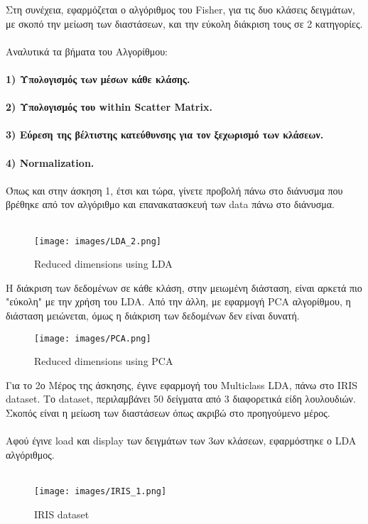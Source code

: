\documentclass[12pt]{article}
\begin{document}
Στη συνέχεια, εφαρμόζεται ο αλγόριθμος του Fisher, για τις δυο κλάσεις δειγμάτων, με σκοπό την μείωση των διαστάσεων, και την εύκολη διάκριση τους σε 2 κατηγορίες. \\\\
Αναλυτικά τα βήματα του Αλγορίθμου:\\\\

{\bfseries 1) Υπολογισμός των μέσων κάθε κλάσης.\\\\
2) Υπολογισμός του within Scatter Matrix.\\\\
3) Εύρεση της βέλτιστης κατεύθυνσης για τον ξεχωρισμό των κλάσεων.\\\\
4) Normalization.\\}\\

Όπως και στην άσκηση 1, έτσι και τώρα, γίνετε προβολή πάνω στο διάνυσμα που βρέθηκε από τον αλγόριθμο και επανακατασκευή των data πάνω στο διάνυσμα.\\ \\
\begin{figure}[!h]
    \centering
    \texttt{[image: images/LDA\_2.png]}
    \caption{Reduced dimensions using LDA}
    \label{fig:my_label}
\end{figure}

 Η διάκριση των δεδομένων σε κάθε κλάση, στην μειωμένη διάσταση, είναι αρκετά πιο "εύκολη" με την χρήση του LDA. Από την άλλη, με εφαρμογή PCA αλγορίθμου, η διάσταση μειώνεται, όμως η διάκριση των δεδομένων δεν είναι δυνατή. \\
 \begin{figure}[!h]
     \centering
     \texttt{[image: images/PCA.png]}
     \caption{Reduced dimensions using PCA}
     \label{fig:my_label}
 \end{figure}
 
 Για το 2ο Μέρος της άσκησης, έγινε εφαρμογή του Multiclass LDA, πάνω στο IRIS dataset. Το dataset, περιλαμβάνει 50 δείγματα από 3 διαφορετικά είδη λουλουδιών. Σκοπός είναι η μείωση των διαστάσεων όπως ακριβώ στο προηγούμενο μέρος.\\\\
 Αφού έγινε load και display των δειγμάτων των 3ων κλάσεων, εφαρμόστηκε ο LDA αλγόριθμος.\\\\
 \begin{figure}[!h]
     \centering
     \texttt{[image: images/IRIS\_1.png]}
     \caption{IRIS dataset}
     \label{fig:my_label}
 \end{figure}
 
\end{document}
